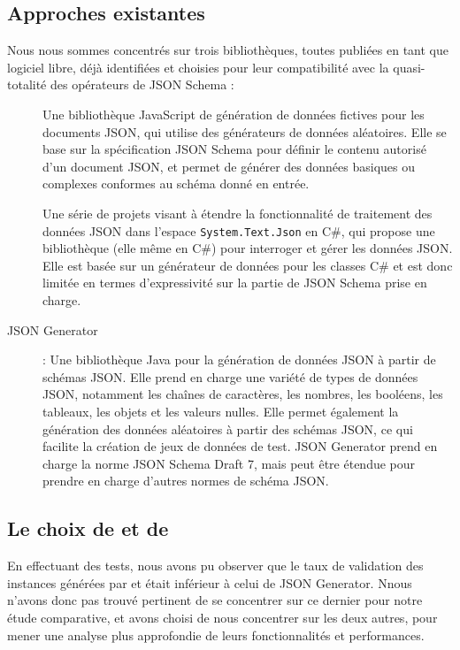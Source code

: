 \documentclass{article}
\begin{document}
    \subsection{Approches existantes}
    Nous nous sommes concentrés sur trois bibliothèques, toutes publiées en tant que logiciel libre, déjà identifiées et choisies pour leur compatibilité avec la quasi-totalité des opérateurs de JSON Schema :\\
    \begin{description}
    \item[\jsf] Une bibliothèque JavaScript de génération de données fictives pour les documents JSON, qui utilise des générateurs de données aléatoires. Elle se base sur la spécification JSON Schema pour définir le contenu autorisé d'un document JSON, et permet de générer des données basiques ou complexes conformes au schéma donné en entrée.
    \item[\je] Une série de projets visant à étendre la fonctionnalité de traitement des données JSON dans l'espace \texttt{System.Text.Json} en C\#, qui propose une bibliothèque (elle même en C\#) pour interroger et gérer les données JSON. Elle est basée sur un générateur de données pour les classes C\# et est donc limitée en termes d'expressivité sur la partie de JSON Schema prise en charge. %
    \item[JSON Generator] : Une bibliothèque Java pour la génération de données JSON à partir de schémas JSON. Elle prend en charge une variété de types de données JSON, notamment les chaînes de caractères, les nombres, les booléens, les tableaux, les objets et les valeurs nulles.
    Elle permet également la génération des données aléatoires à partir des schémas JSON, ce qui facilite la création de jeux de données de test. %
    JSON Generator prend en charge la norme JSON Schema Draft 7, mais peut être étendue pour prendre en charge d'autres normes de schéma JSON.
    \end{description}

    \subsection{Le choix de \jsf et de \je}
    En effectuant des tests, nous avons pu observer que le taux de validation des instances générées par \jsf et \je était inférieur à celui de JSON Generator. Nnous n'avons donc pas trouvé pertinent de se concentrer sur ce dernier pour notre étude comparative, et avons choisi de nous concentrer sur les deux autres, pour mener une analyse plus approfondie de leurs fonctionnalités et performances.
\end{document}
